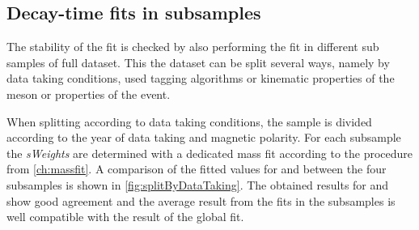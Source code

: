 \subsection{Decay-time fits in subsamples}
\label{sec:valOnSubSample}

The stability of the fit is checked by also performing the fit in different sub samples of full dataset.
This the dataset can be split several ways, namely by data taking conditions, used tagging algorithms or kinematic properties of the \Bz meson or properties of the event.

When splitting according to data taking conditions, the \BdToDpi sample is divided according to the year of data taking and magnetic polarity.
For each subsample the \emph{sWeights} are determined with a dedicated mass fit according to the procedure from \cref{ch:massfit}.
A comparison of the fitted values for \Sf and \Sfbar between the four subsamples is shown in \cref{fig:splitByDataTaking}.
The obtained results for \Sf and \Sfbar show good agreement and the average result from the fits in the subsamples is well compatible with the result of the global fit.
